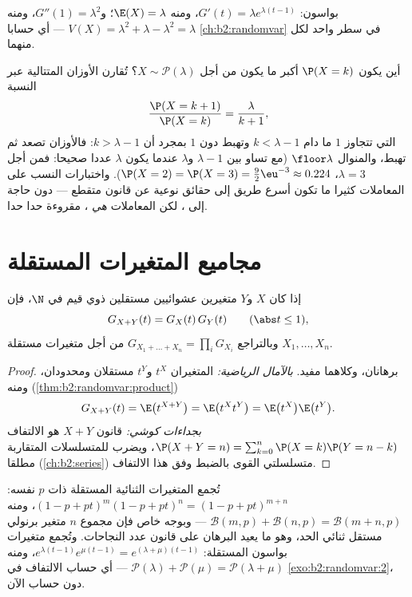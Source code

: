 \begin{example}
بواسون: $G'(t) = \lambda e^{\lambda(t-1)}$، ومنه $\E(X) = \lambda$؛ و$G''(1) = \lambda^2$، ومنه $V(X) = \lambda^2 + \lambda - \lambda^2 =
\lambda$ --- أي حسابا
\cref{ch:b2:randomvar} في سطر واحد لكل منهما.
\end{example}

\begin{example}
\label{ex:b2:genfun:poissonmode}
أين يكون $\P(X = k)$ أكبر ما يكون من أجل $X \sim \mathcal
P(\lambda)$؟ تُقارن الأوزان
المتتالية عبر النسبة
\[
\frac{\P(X = k+1)}{\P(X = k)} = \frac{\lambda}{k + 1} ,
\]
التي تتجاوز $1$ ما دام $k < \lambda - 1$ وتهبط دون $1$ بمجرد أن $k > \lambda - 1$:
فالأوزان تصعد ثم تهبط، والمنوال $\floor\lambda$ (مع تساو بين $\lambda - 1$ و$\lambda$
عندما يكون $\lambda$ عددا صحيحا: فمن أجل $\lambda = 3$، $\P(X = 2) = \P(X = 3) = \frac92\eu^{-3} \approx 0.224$).
واختبارات النسب على المعاملات كثيرا ما تكون أسرع طريق إلى حقائق
نوعية عن قانون متقطع --- دون حاجة إلى ، لكن المعاملات
\emph{هي} ، مقروءة حدا حدا.
\end{example}

\section{مجاميع المتغيرات المستقلة}

\begin{theorem}[الضربية]\label{thm:b2:genfun:product}
إذا كان $X$ و$Y$ متغيرين عشوائيين مستقلين ذوي قيم في $\N$،
فإن
\[
G_{X + Y}(t) = G_X(t)\,G_Y(t)
\qquad (\abs t \leq 1),
\]
وبالتراجع $G_{X_1 + \dots + X_n} = \prod_i G_{X_i}$ من أجل متغيرات مستقلة $X_1, \dots, X_n$.
\end{theorem}

\begin{proof}
برهانان، وكلاهما مفيد. \emph{بالآمال الرياضية:} المتغيران $t^X$
و$t^Y$ مستقلان ومحدودان، ومنه (\cref{thm:b2:randomvar:product})
\[
G_{X+Y}(t) = \E\bigl(t^{X+Y}\bigr)
= \E\bigl(t^X t^Y\bigr)
= \E\bigl(t^X\bigr)\E\bigl(t^Y\bigr) .
\]
\emph{بجداءات كوشي:} قانون $X + Y$ هو الالتفاف $\P(X + Y = n) = \sum_{k=0}^n \P(X = k)\P(Y = n - k)$، ويضرب  للمتسلسلات المتقاربة مطلقا (\cref{ch:b2:series}) متسلسلتي القوى بالضبط وفق
هذا الالتفاف.
\end{proof}

\begin{example}\label{ex:b2:genfun:stability}
تُجمع المتغيرات الثنائية المستقلة ذات $p$ نفسه: $(1 - p + pt)^m(1 -
p + pt)^n = (1 - p + pt)^{m+n}$، ومنه
$\mathcal{B}(m, p) +
\mathcal{B}(n, p) = \mathcal{B}(m + n, p)$ --- وبوجه خاص فإن مجموع $n$ متغير برنولي مستقل ثنائي
الحد، وهو ما يعيد البرهان على قانون عدد النجاحات. وتُجمع متغيرات
بواسون المستقلة: $e^{\lambda(t-1)}e^{\mu(t-1)} = e^{(\lambda + \mu)(t-1)}$، ومنه $\mathcal{P}(\lambda) + \mathcal{P}(\mu) = \mathcal{P}(\lambda +
\mu)$ --- أي حساب الالتفاف في \cref{exo:b2:randomvar:2}،
دون حساب الآن.
\end{example}

